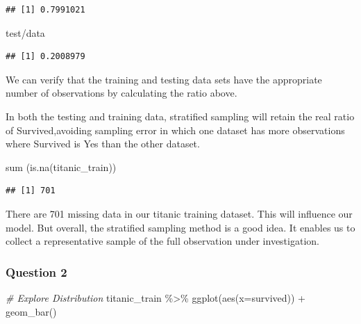 \documentclass[
]{article}
\newenvironment{Shaded}{\begin{snugshade}}{\end{snugshade}}
\newcommand{\AttributeTok}[1]{\textcolor[rgb]{0.77,0.63,0.00}{#1}}
\newcommand{\CommentTok}[1]{\textcolor[rgb]{0.56,0.35,0.01}{\textit{#1}}}
\newcommand{\FunctionTok}[1]{\textcolor[rgb]{0.00,0.00,0.00}{#1}}
\newcommand{\NormalTok}[1]{#1}
\newcommand{\SpecialCharTok}[1]{\textcolor[rgb]{0.00,0.00,0.00}{#1}}
\begin{document}
\begin{verbatim}
## [1] 0.7991021
\end{verbatim}

\begin{Shaded}
\begin{Highlighting}[]
\NormalTok{test}\SpecialCharTok{/}\NormalTok{data}
\end{Highlighting}
\end{Shaded}

\begin{verbatim}
## [1] 0.2008979
\end{verbatim}

We can verify that the training and testing data sets have the
appropriate number of observations by calculating the ratio above.

In both the testing and training data, stratified sampling will retain
the real ratio of Survived,avoiding sampling error in which one dataset
has more observations where Survived is Yes than the other dataset.

\begin{Shaded}
\begin{Highlighting}[]
\FunctionTok{sum}\NormalTok{ (}\FunctionTok{is.na}\NormalTok{(titanic\_train))}
\end{Highlighting}
\end{Shaded}

\begin{verbatim}
## [1] 701
\end{verbatim}

There are 701 missing data in our titanic training dataset. This will
influence our model. But overall, the stratified sampling method is a
good idea. It enables us to collect a representative sample of the full
observation under investigation.

\hypertarget{question-2}{%
\subsubsection{Question 2}\label{question-2}}

\begin{Shaded}
\begin{Highlighting}[]
\CommentTok{\# Explore Distribution}
\NormalTok{titanic\_train }\SpecialCharTok{\%\textgreater{}\%} \FunctionTok{ggplot}\NormalTok{(}\FunctionTok{aes}\NormalTok{(}\AttributeTok{x=}\NormalTok{survived)) }\SpecialCharTok{+} \FunctionTok{geom\_bar}\NormalTok{()}
\end{Highlighting}
\end{Shaded}
\end{document}
